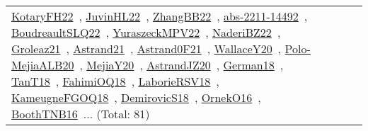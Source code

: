 {\begin{longtable}{lp{3cm}>{\raggedright\arraybackslash}p{6cm}>{\raggedright\arraybackslash}p{6cm}>{\raggedright\arraybackslash}p{8cm}}
\href{../works/KotaryFH22.pdf}{KotaryFH22}~\cite{KotaryFH22}, \href{../works/JuvinHL22.pdf}{JuvinHL22}~\cite{JuvinHL22}, \href{../works/ZhangBB22.pdf}{ZhangBB22}~\cite{ZhangBB22}, \href{../works/abs-2211-14492.pdf}{abs-2211-14492}~\cite{abs-2211-14492}, \href{../works/BoudreaultSLQ22.pdf}{BoudreaultSLQ22}~\cite{BoudreaultSLQ22}, \href{../works/YuraszeckMPV22.pdf}{YuraszeckMPV22}~\cite{YuraszeckMPV22}, \href{../works/NaderiBZ22.pdf}{NaderiBZ22}~\cite{NaderiBZ22}, \href{../works/Groleaz21.pdf}{Groleaz21}~\cite{Groleaz21}, \href{../works/Astrand21.pdf}{Astrand21}~\cite{Astrand21}, \href{../works/Astrand0F21.pdf}{Astrand0F21}~\cite{Astrand0F21}, \href{../works/WallaceY20.pdf}{WallaceY20}~\cite{WallaceY20}, \href{../works/Polo-MejiaALB20.pdf}{Polo-MejiaALB20}~\cite{Polo-MejiaALB20}, \href{../works/MejiaY20.pdf}{MejiaY20}~\cite{MejiaY20}, \href{../works/AstrandJZ20.pdf}{AstrandJZ20}~\cite{AstrandJZ20}, \href{../works/German18.pdf}{German18}~\cite{German18}, \href{../works/TanT18.pdf}{TanT18}~\cite{TanT18}, \href{../works/FahimiOQ18.pdf}{FahimiOQ18}~\cite{FahimiOQ18}, \href{../works/LaborieRSV18.pdf}{LaborieRSV18}~\cite{LaborieRSV18}, \href{../works/KameugneFGOQ18.pdf}{KameugneFGOQ18}~\cite{KameugneFGOQ18}, \href{../works/DemirovicS18.pdf}{DemirovicS18}~\cite{DemirovicS18}, \href{../works/OrnekO16.pdf}{OrnekO16}~\cite{OrnekO16}, \href{../works/BoothTNB16.pdf}{BoothTNB16}~\cite{BoothTNB16}... (Total: 81)\\

\end{longtable}}
